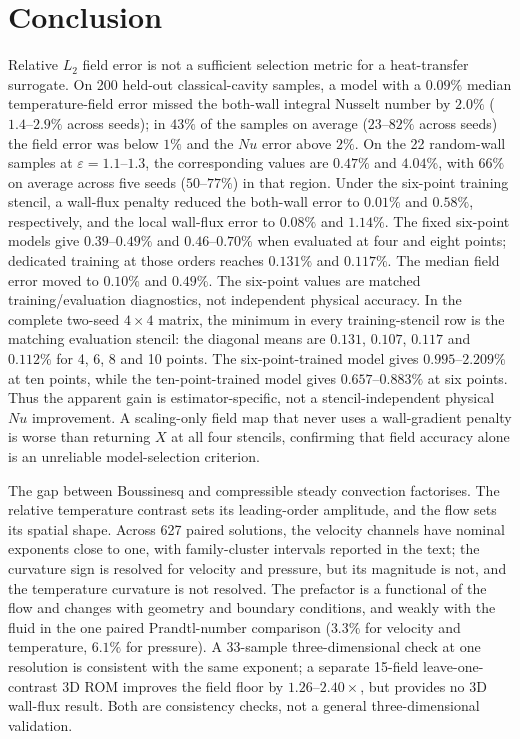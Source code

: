 \documentclass[preprint,11pt,a4paper,times]{elsarticle}
\begin{document}
\section{Conclusion}

Relative $L_2$ field error is not a sufficient selection metric for a heat-transfer surrogate.
On 200 held-out classical-cavity samples, a model with a $0.09\%$ median temperature-field error
missed the both-wall integral Nusselt number by $2.0\%$ ($1.4$--$2.9\%$ across seeds); in
$43\%$ of the samples on average ($23$--$82\%$ across seeds) the field error was below $1\%$ and
the $Nu$ error above $2\%$. On the 22 random-wall samples at $\varepsilon=1.1$--$1.3$, the
corresponding values are $0.47\%$ and $4.04\%$, with $66\%$ on average across five seeds
($50$--$77\%$) in that region. Under the six-point training stencil, a wall-flux penalty reduced
the both-wall error to $0.01\%$ and $0.58\%$, respectively, and the local wall-flux error to
$0.08\%$ and $1.14\%$. The fixed six-point models give $0.39$--$0.49\%$ and
$0.46$--$0.70\%$ when evaluated at four and eight points; dedicated training at
those orders reaches $0.131\%$ and $0.117\%$. The median field error moved to
$0.10\%$ and $0.49\%$.
The six-point values are matched training/evaluation diagnostics, not independent physical
accuracy. In the complete two-seed $4\times4$ matrix, the minimum in every training-stencil
row is the matching evaluation stencil: the diagonal means are $0.131$, $0.107$, $0.117$ and
$0.112\%$ for 4, 6, 8 and 10 points. The six-point-trained model gives $0.995$--$2.209\%$ at
ten points, while the ten-point-trained model gives $0.657$--$0.883\%$ at six points. Thus
the apparent gain is estimator-specific, not a stencil-independent physical $Nu$ improvement.
A scaling-only field map that never uses a wall-gradient penalty is worse than returning $X$
at all four stencils, confirming that field accuracy alone is an unreliable model-selection
criterion.

The gap between Boussinesq and compressible steady convection factorises. The relative
temperature contrast sets its leading-order amplitude, and the flow sets its spatial shape.
Across 627 paired solutions, the velocity channels have nominal exponents close to one, with
family-cluster intervals reported in the text; the curvature sign is resolved for velocity and
pressure, but its magnitude is not, and the temperature curvature is not resolved. The
prefactor is a functional of the flow and changes with geometry and boundary conditions, and
weakly with the fluid in the one paired Prandtl-number comparison ($3.3\%$ for velocity and
temperature, $6.1\%$ for pressure). A 33-sample three-dimensional check at one resolution is
consistent with the same exponent; a separate 15-field leave-one-contrast 3D ROM improves the
field floor by $1.26$--$2.40\times$, but provides no 3D wall-flux result. Both are consistency
checks, not a general three-dimensional validation.
\end{document}

